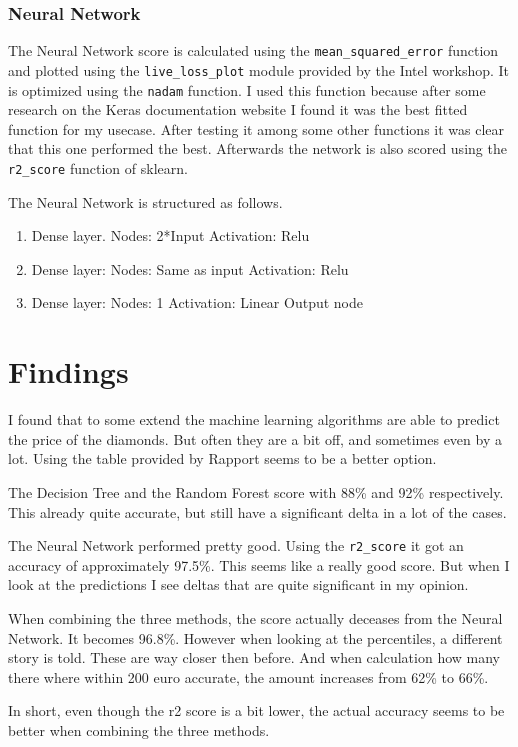 \documentclass{scrreprt}
\begin{document}
			\subsection{Neural Network}
				The Neural Network score is calculated using the \texttt{mean\_squared\_error} function and plotted using the \texttt{live\_loss\_plot} module provided by the Intel workshop. It is optimized using the \texttt{nadam} function. I used this function because after some research on the Keras documentation website I found it was the best fitted function for my usecase. After testing it among some other functions it was clear that this one performed the best. Afterwards the network is also scored using the \texttt{r2\_score} function of sklearn.\par
				\vspace{1em}
				The Neural Network is structured as follows.
				\begin{enumerate}
					\item Dense layer.
						\subitem Nodes: 2*Input
						\subitem Activation: Relu
					\item Dense layer:
						\subitem Nodes: Same as input
						\subitem Activation: Relu
					\item Dense layer:
						\subitem Nodes: 1
						\subitem Activation: Linear
						\subitem Output node
				\end{enumerate}
	\chapter{Findings}
		I found that to some extend the machine learning algorithms are able to predict the price of the diamonds. But often they are a bit off, and sometimes even by a lot. Using the table provided by Rapport seems to be a better option.\par
		The Decision Tree and the Random Forest score with 88\% and 92\% respectively. This already quite accurate, but still have a significant delta in a lot of the cases.\par
		\vspace{1em}
		The Neural Network performed pretty good. Using the \texttt{r2\_score} it got an accuracy of approximately 97.5\%. This seems like a really good score. But when I look at the predictions I see deltas that are quite significant in my opinion.\par
		\vspace{1em}
		When combining the three methods, the score actually deceases from the Neural Network. It becomes 96.8\%. However when looking at the percentiles, a different story is told. These are way closer then before. And when calculation how many there where within 200 euro accurate, the amount increases from 62\% to 66\%.\par
		In short, even though the r2 score is a bit lower, the actual accuracy seems to be better when combining the three methods.
\end{document}
